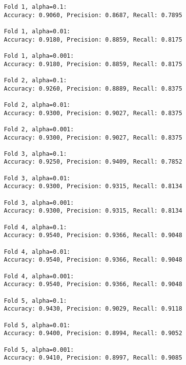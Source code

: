 \documentclass[11pt]{article}
\begin{document}
    \begin{Verbatim}[commandchars=\\\{\}]
Fold 1, alpha=0.1:
Accuracy: 0.9060, Precision: 0.8687, Recall: 0.7895

Fold 1, alpha=0.01:
Accuracy: 0.9180, Precision: 0.8859, Recall: 0.8175

Fold 1, alpha=0.001:
Accuracy: 0.9180, Precision: 0.8859, Recall: 0.8175

Fold 2, alpha=0.1:
Accuracy: 0.9260, Precision: 0.8889, Recall: 0.8375

Fold 2, alpha=0.01:
Accuracy: 0.9300, Precision: 0.9027, Recall: 0.8375

Fold 2, alpha=0.001:
Accuracy: 0.9300, Precision: 0.9027, Recall: 0.8375

Fold 3, alpha=0.1:
Accuracy: 0.9250, Precision: 0.9409, Recall: 0.7852

Fold 3, alpha=0.01:
Accuracy: 0.9300, Precision: 0.9315, Recall: 0.8134

Fold 3, alpha=0.001:
Accuracy: 0.9300, Precision: 0.9315, Recall: 0.8134

Fold 4, alpha=0.1:
Accuracy: 0.9540, Precision: 0.9366, Recall: 0.9048

Fold 4, alpha=0.01:
Accuracy: 0.9540, Precision: 0.9366, Recall: 0.9048

Fold 4, alpha=0.001:
Accuracy: 0.9540, Precision: 0.9366, Recall: 0.9048

Fold 5, alpha=0.1:
Accuracy: 0.9430, Precision: 0.9029, Recall: 0.9118

Fold 5, alpha=0.01:
Accuracy: 0.9400, Precision: 0.8994, Recall: 0.9052

Fold 5, alpha=0.001:
Accuracy: 0.9410, Precision: 0.8997, Recall: 0.9085

    \end{Verbatim}
\end{document}
